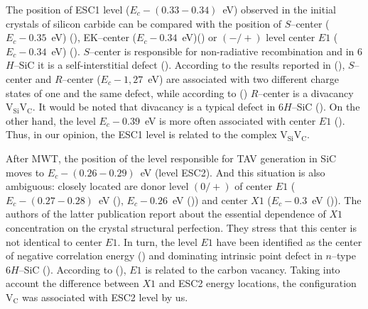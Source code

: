 \documentclass[final,3p,times,twocolumn,authoryear]{elsarticle}
\begin{document}

%





The position of ESC1 level ($E_c-(0.33-0.34)$~eV) observed in the initial crystals of silicon carbide can be compared
with the position of $S$--center ($E_c-0.35$~eV) (\cite{Lebed1999En,Anikin1991:2En,Anikin1991:3En}),
EK–center ($E_c-0.34$~eV)(\cite{Kuznets1997En})
or $(-/+)$ level center $E1$ ($E_c-0.34$~eV) (\cite{Lebed1999En}).
$S$--center is responsible for non-radiative recombination and
in 6$H$–SiC it is a self-interstitial defect (\cite{Lebed1999En}).
According to the results reported in (\cite{Anikin1991:2En,Anikin1991:3En}),
$S$--center and $R$--center ($E_c-1,27$~eV) are associated with two different charge states
of one and the same defect,
while according to (\cite{Lebedev2000En})
$R$--center is a divacancy $\mathrm{V}_\mathrm{Si}\mathrm{V}_\mathrm{C}$.
It would be noted that  divacancy is a typical defect in 6$H$--SiC
(\cite{SiCBaran,SiCDavid}).
On the other hand, the level $E_c-0.39$~eV is more often associated with center $E1$
(\cite{SiCWei,SiCKoizumi}).
Thus, in our opinion, the ESC1 level is related to the  complex $\mathrm{V}_\mathrm{Si}\mathrm{V}_\mathrm{C}$.


After MWT, the position of the level responsible for TAV generation in SiC moves
to $E_c-(0.26-0.29)$~eV (level ESC2).
And this situation is also ambiguous: closely located are donor level $(0/+)$ of
center $E1$ ($E_c-(0.27-0.28)$~eV (\cite{Hemmingsson}),
$E_c-0.26$~eV (\cite{SiCWei,SiCKoizumi}))
and center $X1$ ($E_c-0.3$~eV (\cite{Lebedev2001En})).
The authors of the latter publication report about the essential dependence of $X1$ concentration on the crystal structural perfection.
They stress that this center is not identical to center $E1$.
In turn, the level $E1$ have been identified as the center of negative correlation energy
(\cite{Lebedev2001En,SiCWei})
and dominating intrinsic point defect in $n$--type 6$H$--SiC
(\cite{SiCSasaki}).
According to (\cite{SiCSasaki,SiCWei}), $E1$ is related to the carbon vacancy.
Taking into account the difference between $X1$ and ESC2 energy locations,
the configuration $\mathrm{V}_\mathrm{C}$ was associated with ESC2 level by us.
\end{document}
